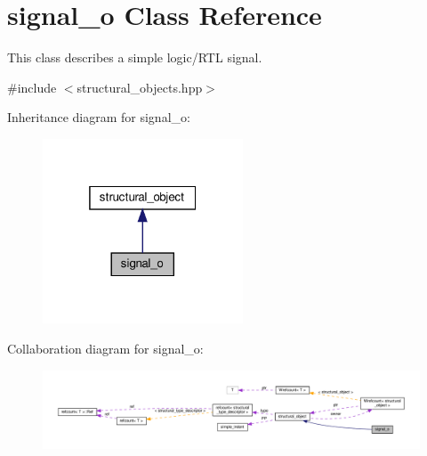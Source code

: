 \hypertarget{classsignal__o}{}\section{signal\+\_\+o Class Reference}
\label{classsignal__o}


This class describes a simple logic/\+R\+TL signal.  




{\ttfamily \#include $<$structural\+\_\+objects.\+hpp$>$}



Inheritance diagram for signal\+\_\+o\+:
\nopagebreak
\begin{figure}[H]
\begin{center}
\leavevmode
\includegraphics[width=169pt]{d2/df9/classsignal__o__inherit__graph}
\end{center}
\end{figure}


Collaboration diagram for signal\+\_\+o\+:
\nopagebreak
\begin{figure}[H]
\begin{center}
\leavevmode
\includegraphics[width=350pt]{df/dc1/classsignal__o__coll__graph}
\end{center}
\end{figure}
